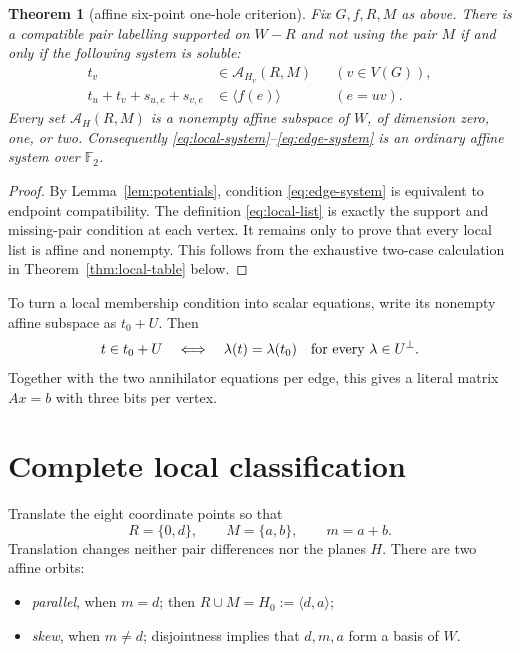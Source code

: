 \documentclass[11pt]{article}
\newtheorem{theorem}{Theorem}[section]
\theoremstyle{definition}
\theoremstyle{remark}
\newcommand{\F}{\mathbb F}
\newcommand{\A}{\mathcal A}
\numberwithin{equation}{section}
\begin{document}
\begin{theorem}[affine six-point one-hole criterion]
\label{thm:affine}
Fix \(G,f,R,M\) as above.  There is a compatible pair labelling supported
on \(W-R\) and not using the pair \(M\) if and only if the following
system is soluble:
\begin{align}
 t_v&\in\A_{H_v}(R,M)
                         &&(v\in V(G)), \label{eq:local-system}\\
 t_u+t_v+s_{u,e}+s_{v,e}
     &\in\langle f(e)\rangle
                         &&(e=uv). \label{eq:edge-system}
\end{align}
Every set \(\A_H(R,M)\) is a nonempty affine subspace of \(W\), of
dimension zero, one, or two.  Consequently
\eqref{eq:local-system}--\eqref{eq:edge-system} is an ordinary affine
system over \(\F_2\).
\end{theorem}

\begin{proof}
By Lemma~\ref{lem:potentials}, condition \eqref{eq:edge-system} is
equivalent to endpoint compatibility.  The definition
\eqref{eq:local-list} is exactly the support and missing-pair condition
at each vertex.  It remains only to prove that every local list is affine
and nonempty.  This follows from the exhaustive two-case calculation in
Theorem~\ref{thm:local-table} below.
\end{proof}

To turn a local membership condition into scalar equations, write its
nonempty affine subspace as \(t_0+U\).  Then
\[
        t\in t_0+U
        \quad\Longleftrightarrow\quad
        \lambda(t)=\lambda(t_0)
        \quad\hbox{for every }\lambda\in U^\perp.
\]
Together with the two annihilator equations per edge, this gives a
literal matrix \(Ax=b\) with three bits per vertex.

\section{Complete local classification}

Translate the eight coordinate points so that
\begin{equation}
                    R=\{0,d\},\qquad M=\{a,b\},\qquad m=a+b.
                    \label{eq:normal}
\end{equation}
Translation changes neither pair differences nor the planes \(H\).
There are two affine orbits:
\begin{itemize}
\item \emph{parallel}, when \(m=d\); then
      \(R\cup M=H_0:=\langle d,a\rangle\);
\item \emph{skew}, when \(m\ne d\); disjointness implies that
      \(d,m,a\) form a basis of \(W\).
\end{itemize}
\end{document}

